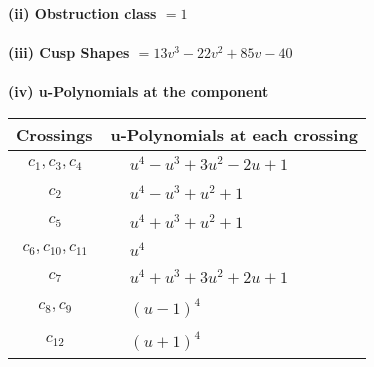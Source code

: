 \documentclass[1p]{elsarticle_modified}
\theoremstyle{definition}
\begin{document}
\flushleft \textbf{(ii) Obstruction class $= 1$}\\~\\
\flushleft \textbf{(iii) Cusp Shapes $= 13 v^3-22 v^2+85 v-40$}\\~\\
\newpage\renewcommand{\arraystretch}{1}
\flushleft \textbf{(iv) u-Polynomials at the component}\newline \\
\begin{tabular}{m{50pt}|m{274pt}}
Crossings & \hspace{64pt}u-Polynomials at each crossing \\
\hline $$\begin{aligned}c_{1},c_{3},c_{4}\end{aligned}$$&$\begin{aligned}
&u^4- u^3+3 u^2-2 u+1
\end{aligned}$\\
\hline $$\begin{aligned}c_{2}\end{aligned}$$&$\begin{aligned}
&u^4- u^3+u^2+1
\end{aligned}$\\
\hline $$\begin{aligned}c_{5}\end{aligned}$$&$\begin{aligned}
&u^4+u^3+u^2+1
\end{aligned}$\\
\hline $$\begin{aligned}c_{6},c_{10},c_{11}\end{aligned}$$&$\begin{aligned}
&u^4
\end{aligned}$\\
\hline $$\begin{aligned}c_{7}\end{aligned}$$&$\begin{aligned}
&u^4+u^3+3 u^2+2 u+1
\end{aligned}$\\
\hline $$\begin{aligned}c_{8},c_{9}\end{aligned}$$&$\begin{aligned}
&(u-1)^4
\end{aligned}$\\
\hline $$\begin{aligned}c_{12}\end{aligned}$$&$\begin{aligned}
&(u+1)^4
\end{aligned}$\\
\hline
\end{tabular}\\~\\
\end{document}
